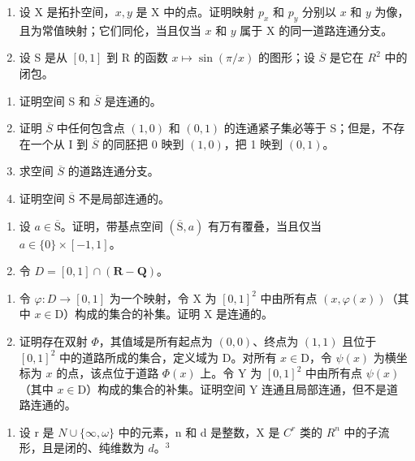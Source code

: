 \exercisegroup

\begin{enumerate}
\def\labelenumi{\arabic{enumi})}
\item
 设 X 是拓扑空间，\(x, y\) 是 X 中的点。证明映射 \(p_x\) 和 \(p_y\) 分别以 \(x\) 和 \(y\) 为像，且为常值映射；它们同伦，当且仅当 \(x\) 和 \(y\) 属于 X 的同一道路连通分支。
\item
  设 S 是从 \([0,1]\) 到 R 的函数 \(x \mapsto \sin(\pi/x)\) 的图形；设 \(\overline{S}\) 是它在 \(R^{2}\) 中的闭包。
\end{enumerate}

\begin{enumerate}
\def\labelenumi{\alph{enumi})}
\item
  证明空间 S 和 \(\overline{S}\) 是连通的。
\item
  证明 \(\overline{S}\) 中任何包含点 \((1,0)\) 和 \((0,1)\) 的连通紧子集必等于 S；但是，不存在一个从 I 到 \(\overline{S}\) 的同胚把 0 映到 \((1,0)\)，把 1 映到 \((0,1)\)。
\item
  求空间 \(\overline{S}\) 的道路连通分支。
\item
  证明空间 \(\overline{\mathrm{S}}\) 不是局部连通的。
\end{enumerate}

\begin{enumerate}
\def\labelenumi{\arabic{enumi})}
\setcounter{enumi}{2}
\item
  设 \(a \in \overline{\mathrm{S}}\)。证明，带基点空间 \((\overline{\mathrm{S}}, a)\) 有万有覆叠，当且仅当 \(a \in \{0\} \times [-1, 1]\)。
\item
  令 \(D = [0, 1] \cap (\mathbf{R} - \mathbf{Q})\)。
\end{enumerate}

\begin{enumerate}
\def\labelenumi{\alph{enumi})}
\item
 令 \(\varphi\colon D \to [0,1]\) 为一个映射，令 X 为 \([0,1]^2\) 中由所有点 \((x,\varphi(x))\)（其中 \(x\in\mathrm{D}\)）构成的集合的补集。证明 X 是连通的。
\item
  证明存在双射 \(\Phi\)，其值域是所有起点为 \((0,0)\)、终点为 \((1,1)\) 且位于 \([0,1]^2\) 中的道路所成的集合，定义域为 D。对所有 \(x \in \mathrm{D}\)，令 \(\psi(x)\) 为横坐标为 \(x\) 的点，该点位于道路 \(\Phi(x)\) 上。令 Y 为 \([0,1]^2\) 中由所有点 \(\psi(x)\)（其中 \(x \in \mathrm{D}\)）构成的集合的补集。证明空间 Y 连通且局部连通，但不是道路连通的。
\end{enumerate}

\begin{enumerate}
\def\labelenumi{\arabic{enumi})}
\setcounter{enumi}{4}
\tightlist
\item
  设 r 是 \(N \cup \{\infty, \omega\}\) 中的元素，n 和 d 是整数，X 是 \(C^{r}\) 类的 \(R^{n}\) 中的子流形，且是闭的、纯维数为 \(d\)。\(^{3}\)
\end{enumerate}

